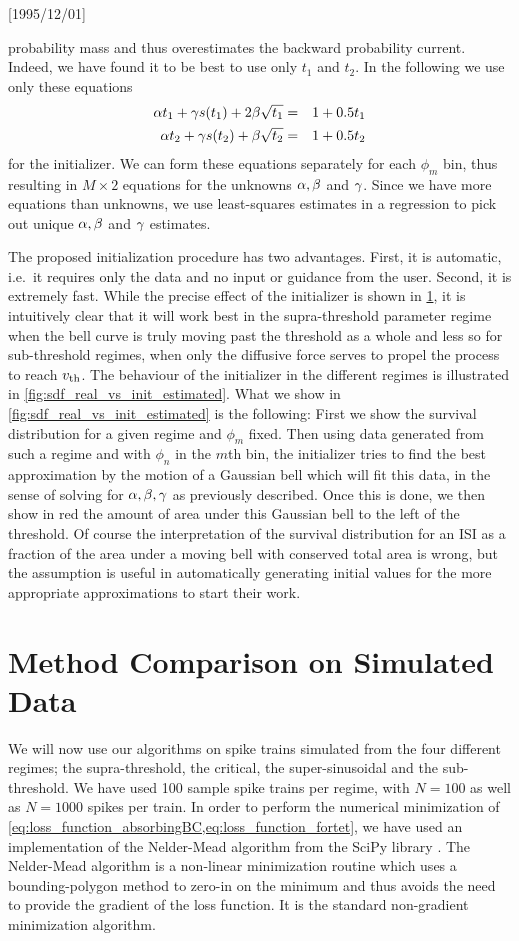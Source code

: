 \NeedsTeXFormat{LaTeX2e}[1995/12/01] \documentclass[10pt]{bmc_article}
\newenvironment{bmcformat}{\begin{raggedright}\baselineskip20pt\sloppy\setboolean{publ}{false}}{\end{raggedright}\baselineskip20pt\sloppy}
\begin{document}
\begin{bmcformat}
probability mass and thus overestimates the backward probability current.
Indeed, we have found it to be best to use only $t_1$ and $t_2$. In the
following we use only these equations
\begin{eqnarray*}
{\alpha} t_1 + {\gamma } s(t_1) + 2{\beta} \sqrt{t_1}
&=& 1 + 0.5 t_1
\\
{\alpha} t_2 + {\gamma } s(t_2) + {\beta} \sqrt{t_2}
&=& 1 + 0.5 t_2 
\end{eqnarray*}
for the initializer.
We can form these equations separately for each $\phi_m$ bin, thus
resulting in $M \times 2$ equations for the unknowns ${\alpha}, {\beta}$ and ${\gamma }$. Since
we have more equations than unknowns, we use least-squares estimates in a
regression to pick out unique ${\alpha},{\beta}$ and ${\gamma }$ estimates. 

The proposed initialization procedure has two advantages. First, it is
automatic, i.e.\ it requires only the data and no input or  guidance from the
user. Second, it is extremely fast. While the precise effect of the initializer
is shown in \cref{sec:method_performance}, it is intuitively clear that it will
work best in the supra-threshold parameter regime when the bell curve is truly
moving past the threshold as a whole and less so for sub-threshold regimes, when
only the diffusive force serves to propel the process to reach ${ v_{\textrm{th} } }$. The
behaviour of the initializer in the different regimes is illustrated in
\cref{fig:sdf_real_vs_init_estimated}. What we show in
\cref{fig:sdf_real_vs_init_estimated} is the following: First we show the
survival distribution for a given regime and $\phi_m$ fixed. Then using data
generated from such a regime and with $\phi_n$ in the $m$th bin, the initializer
tries to find the best approximation by the motion of a Gaussian bell which will
fit this data, in the sense of solving for ${\alpha},{\beta},{\gamma }$ as previously described.
Once this is done, we then show in red the amount of area under this Gaussian
bell to the left of the threshold. Of course the interpretation of the survival
distribution for an ISI as a fraction of the area under a moving bell with
conserved total area is wrong, but the assumption is useful in automatically
generating initial values for the more appropriate approximations to start their
work.



\section{Method Comparison on Simulated Data}
\label{sec:method_performance}
We will now use our algorithms on spike trains simulated from the four different
regimes; the supra-threshold, the critical, the super-sinusoidal and the
sub-threshold. We have used 100 sample spike trains per regime, with $N=100$ as
well as $N=1000$ spikes per train. In order to perform the numerical
minimization of \cref{eq:loss_function_absorbingBC,eq:loss_function_fortet}, we
have used an implementation of the Nelder-Mead algorithm from the SciPy library
\cite{scipy}. The Nelder-Mead algorithm is a non-linear minimization routine
which uses a bounding-polygon method to zero-in on the minimum and thus avoids
the need to provide the gradient of the loss function. It is the standard
non-gradient minimization algorithm.


\end{bmcformat}
\end{document}
